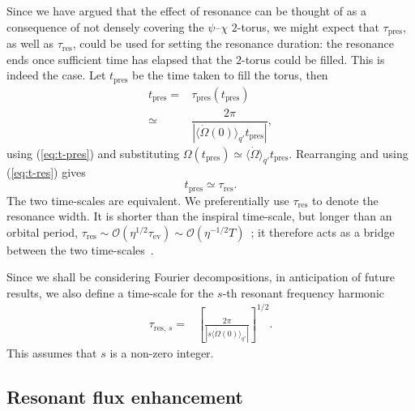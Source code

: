 \documentclass[aps,prd,amsfonts,amssymb,amsmath,nofootinbib,reprint,showpacs]{revtex4}
\newcommand{\eqnref}[1]{(\ref{eq:#1})}
\newcommand{\sub}[1]{\ensuremath{_\text{#1}}}
\newcommand{\order}[1]{\ensuremath{\mathcal{O}({#1})}}
\begin{document}
Since we have argued that the effect of resonance can be thought of as a consequence of not densely covering the $\psi$--$\chi$ $2$-torus, we might expect that $\tau\sub{pres}$, as well as $\tau\sub{res}$, could be used for setting the resonance duration: the resonance ends once sufficient time has elapsed that the $2$-torus could be filled. This is indeed the case. Let $t\sub{pres}$ be the time taken to fill the torus, then
\begin{align}
t\sub{pres} = {} & \tau\sub{pres}(t\sub{pres}) \\
 \simeq {} & \dfrac{2\pi}{\left|\langle\dot{\Omega}(0)\rangle_{q'} t\sub{pres}\right|}, \nonumber 
\end{align}
using \eqnref{t-pres} and substituting $\Omega(t\sub{pres}) \simeq \langle\dot{\Omega}\rangle_{q'} t\sub{pres}$. Rearranging and using \eqnref{t-res} gives
\begin{equation}
t\sub{pres} \simeq \tau\sub{res}.
\end{equation}
The two time-scales are equivalent. We preferentially use $\tau\sub{res}$ to denote the resonance width. It is shorter than the inspiral time-scale, but longer than an orbital period, $\tau\sub{res} \sim \order{\eta^{1/2}\tau\sub{ev}} \sim \order{\eta^{-1/2}T}$~\cite{Flanagan2012,Gair2011a}; it therefore acts as a bridge between the two time-scales~\cite{Hinderer2008}.

Since we shall be considering Fourier decompositions, in anticipation of future results, we also define a time-scale for the $s$-th resonant frequency harmonic
\begin{align}
\tau_{\mathrm{res},\,s} = {} & \left[\frac{2\pi}{\left|s\langle \dot{\Omega}(0)\rangle_{q'}\right|}\right]^{1/2}.
\label{eq:T-res-s}
\end{align}
This assumes that $s$ is a non-zero integer.

\subsection{Resonant flux enhancement}
\end{document}
